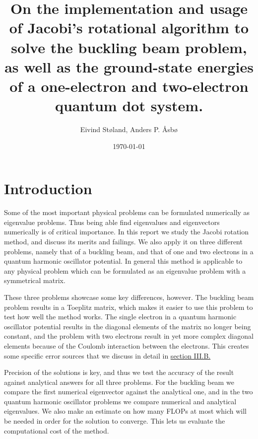 \documentclass[reprint,english,notitlepage]{revtex4-1}  %
\begin{document}
\title{On the implementation and usage of Jacobi's rotational algorithm to solve the buckling beam problem, as well as the ground-state energies of a one-electron and two-electron quantum dot system.}   %
\author{Eivind Støland, Anders P. Åsbø}               %
\date{\today}                             %
\noaffiliation                            %
\maketitle                                %


\tableofcontents

\section{Introduction} \label{sec:I}

Some of the most important physical problems can be formulated numerically as eigenvalue problems. Thus being able find eigenvalues and eigenvectors numerically is of critical importance. In this report we study the Jacobi rotation method, and discuss its merits and failings. We also apply it on three different problems, namely that of a buckling beam, and that of one and two electrons in a quantum harmonic oscillator potential. In general this method is applicable to any physical problem which can be formulated as an eigenvalue problem with a symmetrical matrix. 

These three problems showcase some key differences, however. The buckling beam problem results in a Toeplitz matrix, which makes it easier to use this problem to test how well the method works. The single electron in a quantum harmonic oscillator potential results in the diagonal elements of the matrix no longer being constant, and the problem with two electrons result in yet more complex diagonal elements because of the Coulomb interaction between the electrons. This creates some specific error sources that we discuss in detail in \hyperref[sec:III:b]{section III.B.}

Precision of the solutions is key, and thus we test the accuracy of the result against analytical answers for all three problems. For the buckling beam we compare the first numerical eigenvector against the analytical one, and in the two quantum harmonic oscillator problems we compare numerical and analytical eigenvalues. We also make an estimate on how many FLOPs at most which will be needed in order for the solution to converge. This lets us evaluate the computational cost of the method. 
\end{document}
